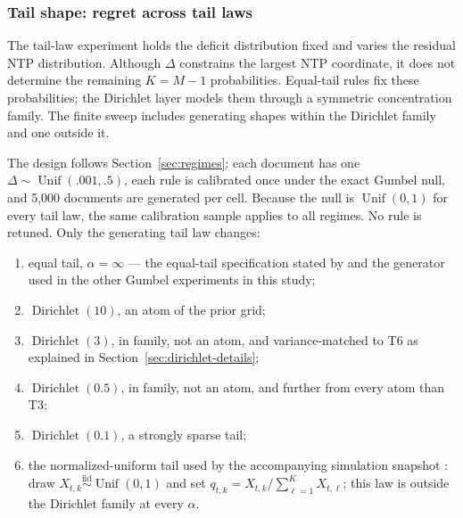 \documentclass[11pt]{article}
\newcommand{\Unif}{\operatorname{Unif}}
\begin{document}
\FloatBarrier
\subsubsection{Tail shape: regret across tail laws}
\label{sec:tails}

The tail-law experiment holds the deficit distribution fixed and varies the residual NTP distribution.  Although $\Delta$ constrains the largest NTP coordinate, it does not determine the remaining $K=M-1$ probabilities.  Equal-tail rules fix these probabilities; the Dirichlet layer models them through a symmetric concentration family.  The finite sweep includes generating shapes within the Dirichlet family and one outside it.

The design follows Section~\ref{sec:regimes}: each document has one $\Delta\sim\Unif(.001,.5)$, each rule is calibrated once under the exact Gumbel null, and 5,000 documents are generated per cell.  Because the null is $\Unif(0,1)$ for every tail law, the same calibration sample applies to all regimes.  No rule is retuned.  Only the generating tail law changes:
\begin{enumerate}
  \setlength{\itemsep}{0pt}
  \setlength{\parsep}{0pt}
  \item[T1] equal tail, $\alpha=\infty$ --- the equal-tail specification stated by \citet{li2025framework} and the generator used in the other Gumbel experiments in this study;
  \item[T2] $\operatorname{Dirichlet}(10)$, an atom of the prior grid;
  \item[T3] $\operatorname{Dirichlet}(3)$, in family, not an atom, and variance-matched to T6 as explained in Section~\ref{sec:dirichlet-details};
  \item[T4] $\operatorname{Dirichlet}(0.5)$, in family, not an atom, and further from every atom than T3;
  \item[T5] $\operatorname{Dirichlet}(0.1)$, a strongly sparse tail;
  \item[T6] the normalized-uniform tail used by the accompanying simulation snapshot \citep{li2024watermarkframework}: draw $X_{t,k}\stackrel{\mathrm{iid}}{\sim}\Unif(0,1)$ and set $q_{t,k}=X_{t,k}/\sum_{\ell=1}^{K}X_{t,\ell}$; this law is outside the Dirichlet family at every $\alpha$.
\end{enumerate}
\end{document}
